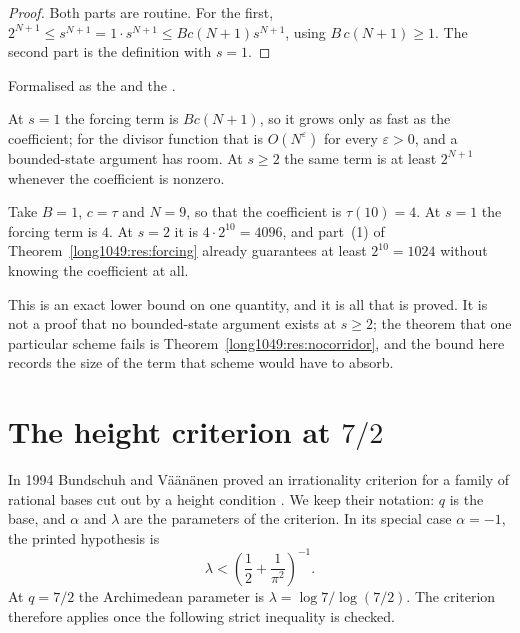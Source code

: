 \documentclass[11pt]{article}
\begin{document}
\begin{proof}
Both parts are routine.  For the first,
$2^{N+1}\le s^{N+1}=1\cdot s^{N+1}\le Bc(N+1)s^{N+1}$,
using $B\,c(N+1)\ge1$.  The second part is the definition with $s=1$.
\end{proof}

\noindent Formalised as the
 and the
.

At $s=1$ the forcing term is $Bc(N+1)$, so it grows only as fast as the
coefficient; for the divisor function that is $O(N^{\varepsilon})$ for every
$\varepsilon>0$, and a bounded-state argument has room.  At $s\ge2$ the same
term is at least $2^{N+1}$ whenever the coefficient is nonzero.

\begin{example}\label{long1049:ex:forcing}
Take $B=1$, $c=\tau$ and $N=9$, so that the coefficient is $\tau(10)=4$.  At
$s=1$ the forcing term is $4$.  At $s=2$ it is $4\cdot2^{10}=4096$, and part~(1)
of Theorem~\ref{long1049:res:forcing} already guarantees at least $2^{10}=1024$ without
knowing the coefficient at all.
\end{example}

This is an
exact lower bound on one quantity, and it is all that is proved.  It is not a
proof that no bounded-state argument exists at $s\ge2$; the theorem that one
particular scheme fails is Theorem~\ref{long1049:res:nocorridor}, and the bound here
records the size of the term that scheme would have to absorb.

\section{The height criterion at $7/2$}\label{long1049:sec:sevenhalves}

In 1994 Bundschuh and V\"a\"an\"anen proved an irrationality criterion for a
family of rational bases cut out by a height condition
\cite[Theorem~2, p.~177; hypotheses pp.~175--176]{bv1994}.  We keep their
notation: $q$ is the base, and $\alpha$
and $\lambda$ are the parameters of the criterion.  In its special case
$\alpha=-1$, the printed hypothesis is
\[
 \lambda<\left(\frac12+\frac1{\pi^2}\right)^{-1}.
\]
At $q=7/2$ the Archimedean parameter is
$\lambda=\log 7/\log(7/2)$.  The criterion therefore applies once the following
strict inequality is checked.
\end{document}
